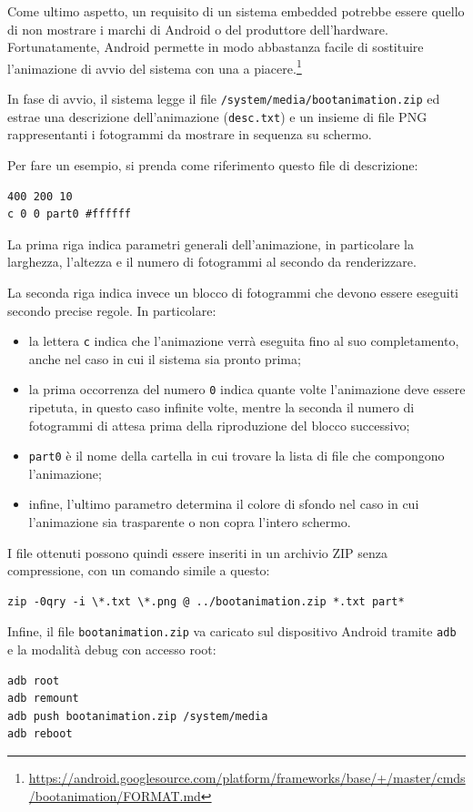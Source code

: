 Come ultimo aspetto, un requisito di un sistema embedded potrebbe essere quello di non mostrare i marchi di Android o del produttore dell'hardware. Fortunatamente, Android permette in modo abbastanza facile di sostituire l'animazione di avvio del sistema con una a piacere.\footnote{\url{https://android.googlesource.com/platform/frameworks/base/+/master/cmds/bootanimation/FORMAT.md}}

In fase di avvio, il sistema legge il file \texttt{/system/media/bootanimation.zip} ed estrae una descrizione dell'animazione (\texttt{desc.txt}) e un insieme di file PNG rappresentanti i fotogrammi da mostrare in sequenza su schermo.

Per fare un esempio, si prenda come riferimento questo file di descrizione:

\begin{verbatim}
400 200 10
c 0 0 part0 #ffffff
\end{verbatim}

La prima riga indica parametri generali dell'animazione, in particolare la larghezza, l'altezza e il numero di fotogrammi al secondo da renderizzare.

La seconda riga indica invece un blocco di fotogrammi che devono essere eseguiti secondo precise regole. In particolare:

\begin{itemize}
	\item la lettera \texttt{c} indica che l'animazione verrà eseguita fino al suo completamento, anche nel caso in cui il sistema sia pronto prima;
	\item la prima occorrenza del numero \texttt{0} indica quante volte l'animazione deve essere ripetuta, in questo caso infinite volte, mentre la seconda il numero di fotogrammi di attesa prima della riproduzione del blocco successivo;
	\item \texttt{part0} è il nome della cartella in cui trovare la lista di file che compongono l'animazione;
	\item infine, l'ultimo parametro determina il colore di sfondo nel caso in cui l'animazione sia trasparente o non copra l'intero schermo.
\end{itemize}

I file ottenuti possono quindi essere inseriti in un archivio ZIP senza compressione, con un comando simile a questo:

\begin{verbatim}
zip -0qry -i \*.txt \*.png @ ../bootanimation.zip *.txt part*
\end{verbatim}

Infine, il file \texttt{bootanimation.zip} va caricato sul dispositivo Android tramite \texttt{adb} e la modalità debug con accesso root:

\begin{verbatim}
adb root
adb remount
adb push bootanimation.zip /system/media
adb reboot
\end{verbatim}

